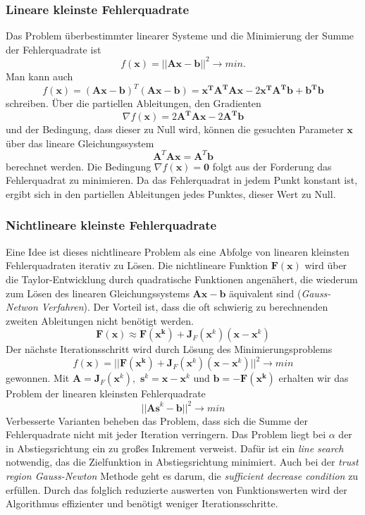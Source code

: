 		\subsubsection{Lineare kleinste Fehlerquadrate}
			Das Problem überbestimmter linearer Systeme und die Minimierung der Summe der Fehlerquadrate ist
			\[f(\bm{x}) = ||\bm{Ax}-\bm{b}||^{2} \rightarrow min.\]
			Man kann auch
			\[f(\bm{x}) = (\bm{Ax}-\bm{b})^{T}(\bm{Ax}-\bm{b}) = \bm{x^{T}A^{T}Ax} - 2\bm{x^{T}A^{T}b} + \bm{b^{T}b} \]
			schreiben. Über die partiellen Ableitungen, den Gradienten 
			\[\nabla f(\bm{x}) = 2\bm{A^{T}Ax} - 2\bm{A^{T}b}\]
			und der Bedingung, dass dieser zu Null wird, können die gesuchten Parameter $ \bm{x} $ über das lineare Gleichungssystem
			\[\bm{A}^{T}\bm{Ax} = \bm{A}^{T}\bm{b}\]
			berechnet werden. Die Bedingung $ \nabla f(\bm{x}) = \bm{0} $ folgt aus der Forderung das Fehlerquadrat zu minimieren. Da das Fehlerquadrat in jedem Punkt konstant ist, ergibt sich in den partiellen Ableitungen jedes Punktes, dieser Wert zu Null.
		\subsubsection{Nichtlineare kleinste Fehlerquadrate}
			Eine Idee ist dieses nichtlineare Problem als eine Abfolge von linearen kleinsten Fehlerquadraten iterativ zu Lösen. Die nichtlineare Funktion $ \bm{F(x)} $ wird über die Taylor-Entwicklung durch quadratische Funktionen angenähert, die wiederum zum Lösen des linearen Gleichungssystems $ \bm{Ax} - \bm{b} $ äquivalent sind (\textit{Gauss-Netwon Verfahren}). Der Vorteil ist, dass die oft schwierig zu berechnenden zweiten Ableitungen nicht benötigt werden.
			\[\bm{F(x)} \approx \bm{F(x^{k})} + \bm{J}_{F}(\bm{x}^{k})(\bm{x} - \bm{x}^{k}) \]
			Der nächste Iterationsschritt wird durch Lösung des Minimierungsproblems
			\[f(\bm{x}) = ||\bm{F(x^{k})} + \bm{J}_{F}(\bm{x}^{k})(\bm{x} - \bm{x}^{k})||^{2} \rightarrow min\]
			gewonnen. Mit $ \bm{A} = \bm{J}_{F}(\bm{x}^{k}), $ $ \bm{s}^{k} = \bm{x-x}^{k} $ und $ \bm{b} = -\bm{F(x^{k})} $ erhalten wir das Problem der linearen kleinsten Fehlerquadrate
			\[||\bm{As}^{k} - \bm{b}||^{2}\rightarrow min \]
			Verbesserte Varianten beheben das Problem, dass sich die Summe der Fehlerquadrate nicht mit jeder Iteration verringern. Das Problem liegt bei $ \alpha $ der in Abstiegsrichtung ein zu großes Inkrement verweist. Dafür ist ein \textit{line search} notwendig, das die Zielfunktion in Abstiegsrichtung minimiert. Auch bei der \textit{trust region Gauss-Newton} Methode geht es darum, die \textit{sufficient decrease condition} zu erfüllen. Durch das folglich reduzierte auswerten von Funktionswerten wird der Algorithmus effizienter und benötigt weniger Iterationsschritte.
